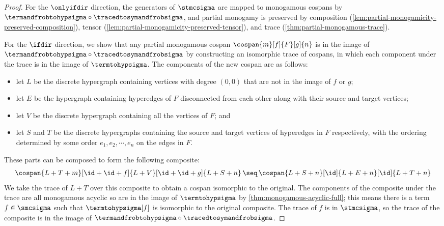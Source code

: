 \begin{proof}
    For the \(\onlyifdir\) direction, the generators of \(\stmcsigma\) are mapped to
    monogamous cospans by \(
    \termandfrobtohypsigma \circ \tracedtosymandfrobsigma
    \), and partial monogamy is preserved by composition
    (\cref{lem:partial-monogamicity-preserved-composition}),
    tensor (\cref{lem:partial-monogamicity-preserved-tensor}),
    and trace
    (\cref{thm:partial-monogamous-trace}).

    For the \(\ifdir\) direction, we show that any partial monogamous cospan \(
    \cospan{m}[f]{F}[g]{n}
    \) is in the image of \(
    \termandfrobtohypsigma \circ \tracedtosymandfrobsigma
    \) by constructing an isomorphic trace of cospans, in which
    each component under the trace is in the image of \(\termtohypsigma\).
    The components of the new cospan are as follows:
    \begin{itemize}
        \item let \(L\) be the discrete hypergraph containing vertices with
              degree
              \((0,0)\) that are not in the image of \(f\) or \(g\);
        \item let \(E\) be the hypergraph containing hyperedges of \(F\)
              disconnected from each other along with their source and target
              vertices;
        \item let \(V\) be the discrete hypergraph containing all the
              vertices of \(F\); and
        \item let \(S\) and \(T\) be the discrete hypergraphs containing
              the source and target vertices of hyperedges in \(F\)
              respectively, with the ordering determined by some order
              \(e_1,e_2,\cdots,e_n\) on the edges in \(F\).
    \end{itemize}
    These parts can be composed to form the following composite:
    \begin{gather*}
        \cospan{L + T + m}[\id + \id + f]{L + V}[\id + \id + g]{L + S + n}
        \,\seq\,
        \cospan{L + S + n}[\id]{L + E + n}[\id]{L + T + n}
    \end{gather*}
    We take the trace of \(L + T\) over this composite to obtain a
    cospan isomorphic to the original.
    The components of the composite under the trace are all monogamous acyclic
    so are in the image of \(\termtohypsigma\) by
    \cref{thm:monogamous-acyclic-full}; this means there is a term
    \(f \in \smcsigma\) such that \(\termtohypsigma[f]\) is isomorphic to the
    original composite.
    The trace of \(f\) is in \(\stmcsigma\), so the trace of the composite is in
    the image of
    \(\termandfrobtohypsigma \circ \tracedtosymandfrobsigma\).
\end{proof}

